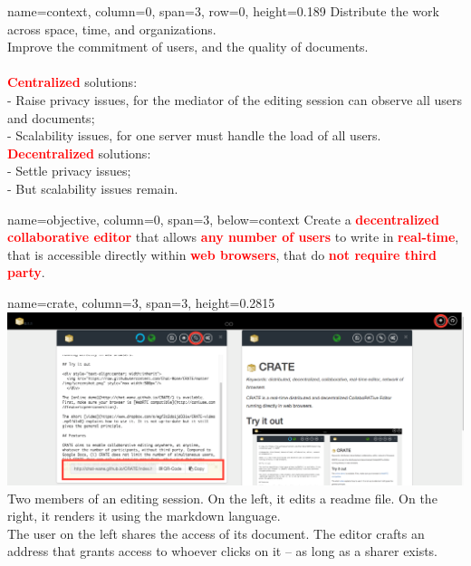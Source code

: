 \documentclass[a1paper, fontscale=0.4, portrait]{baposter}
\newcommand{\RED}[1]{\textcolor{red}{\textbf{#1}}}
\newcommand{\FIRSTROW}{0.189}
\begin{document}
\begin{poster}
  {name=context, column=0, span=3, row=0, height=\FIRSTROW} {
    Distribute the work across space, time, and organizations.\\
    Improve the commitment of users, and the quality of documents.\\
    \\
    \RED{Centralized} solutions: \\
    - Raise privacy issues, for the mediator of the editing session can
      observe all users and documents; \\
    - Scalability issues, for one server must handle the load of all users. \\
    \RED{Decentralized} solutions: \\
    - Settle privacy issues; \\
    - But scalability issues remain.
  }

  
  {name=objective, column=0, span=3, below=context}{ %
    Create a \RED{decentralized collaborative editor} that allows \RED{any number
      of users} to write in \RED{real-time}, that is accessible directly within
    \RED{web browsers}, that do \RED{not require third party}.
  }

  {name=crate, column=3, span=3, height=0.2815}{ %
    \includegraphics[width=\textwidth]{img/crate.png}\\
    Two members of an editing session. On the left, it edits a readme file. On the right,
    it renders it using the markdown language.\\

    The user on the left shares the access of its document.
    The editor crafts an address that grants access to whoever clicks on
    it -- as long as a sharer exists. 
  }


\end{poster}
\end{document}

